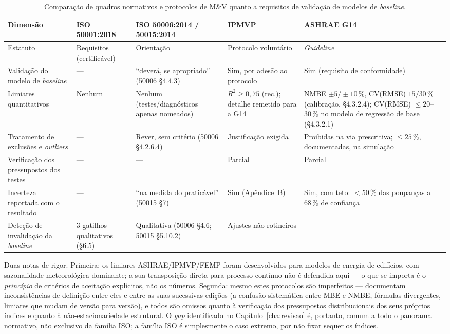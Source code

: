 \begin{table}[htbp]
  \centering\footnotesize
  \caption[Comparação de quadros normativos quanto a requisitos de validação]{Comparação de quadros normativos e protocolos de M\&V quanto a requisitos de validação de modelos de \emph{baseline}.}
  \label{tab:comparacao-frameworks}
  \begin{tabularx}{\textwidth}{@{}>{\raggedright\arraybackslash}p{3.2cm} X X X X@{}}
    \toprule
    \textbf{Dimensão} & \textbf{ISO 50001:2018} & \textbf{ISO 50006:2014 / 50015:2014} & \textbf{IPMVP} & \textbf{ASHRAE G14} \\
    \midrule
    Estatuto & Requisitos (certificável) & Orientação & Protocolo voluntário & \emph{Guideline} \\
    Validação do modelo de \emph{baseline} & --- & \enquote{deverá, se apropriado} (50006 \S4.4.3) & Sim, por adesão ao protocolo & Sim (requisito de conformidade) \\
    Limiares quantitativos & Nenhum & Nenhum (testes/diagnósticos apenas nomeados) & $R^2 \geq 0{,}75$ (rec.); detalhe remetido para a G14 & NMBE $\pm5/\pm10\,\%$, CV(RMSE) $15/30\,\%$ (calibração, \S4.3.2.4); CV(RMSE) $\leq 20$--$30\,\%$ no modelo de regressão de base (\S4.3.2.1) \\
    Tratamento de exclusões e \emph{outliers} & --- & Rever, sem critério (50006 \S4.2.6.4) & Justificação exigida & Proibidas na via prescritiva; $\leq 25\,\%$, documentadas, na simulação \\
    Verificação dos pressupostos dos testes & --- & --- & Parcial & Parcial \\
    Incerteza reportada com o resultado & --- & \enquote{na medida do praticável} (50015 \S7) & Sim (Apêndice~B) & Sim, com teto: $<50\,\%$ das poupanças a $68\,\%$ de confiança \\
    Deteção de invalidação da \emph{baseline} & 3 gatilhos qualitativos (\S6.5) & Qualitativa (50006 \S4.6; 50015 \S5.10.2) & Ajustes não-rotineiros & --- \\
    \bottomrule
  \end{tabularx}
\end{table}

Duas notas de rigor. Primeira: os limiares ASHRAE/IPMVP/FEMP foram desenvolvidos para modelos de energia de edifícios, com sazonalidade meteorológica dominante; a sua transposição direta para processo contínuo não é defendida aqui --- o que se importa é o \emph{princípio} de critérios de aceitação explícitos, não os números. Segunda: mesmo estes protocolos são imperfeitos --- \textcite{RuizBandera2017} documentam inconsistências de definição entre eles e entre as suas sucessivas edições (a confusão sistemática entre MBE e NMBE, fórmulas divergentes, limiares que mudam de versão para versão), e todos são omissos quanto à verificação dos pressupostos distribucionais dos seus próprios índices e quanto à não-estacionariedade estrutural. O \emph{gap} identificado no Capítulo~\ref{cha:revisao} é, portanto, comum a todo o panorama normativo, não exclusivo da família ISO; a família ISO é simplesmente o caso extremo, por não fixar sequer os índices.

